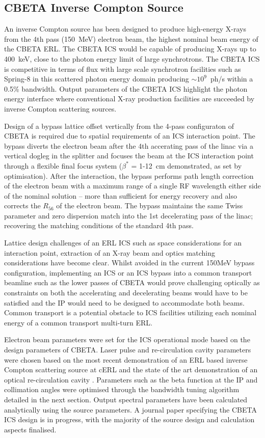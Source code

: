 \documentclass[10pt]{article}
\begin{document}
\subsection*{CBETA Inverse Compton Source}

An inverse Compton source has been designed to produce high-energy X-rays from the 4th pass (150~MeV) electron beam, the highest nominal beam energy of the CBETA ERL. The CBETA ICS would be capable of producing X-rays up to 400~keV, close to the photon energy limit of large synchrotrons. The CBETA ICS is competitive in terms of flux with large scale synchrotron facilities such as Spring-8 in this scattered photon energy domain producing $\sim 10^{9}$~ph/s within a 0.5\% bandwidth. Output parameters of the CBETA ICS highlight the photon energy interface where conventional X-ray production facilities are succeeded by inverse Compton scattering sources.

Design of a bypass lattice offset vertically from the 4-pass configuraton of CBETA is required due to spatial requirements of an ICS interaction point. The bypass diverts the electron beam after the 4th accerating pass of the linac via a vertical dogleg in the splitter and focuses the beam at the ICS interaction point through a flexible final focus system ($\beta^{*}$ = 1-12~cm demonstrated, as set by optimisation). After the interaction, the bypass performs path length correction of the electron beam with a maximum range of a single RF wavelength either side of the nominal solution -- more than sufficient for energy recovery and also corrects the $R_{56}$ of the electron beam. The bypass maintains the same Twiss parameter and zero dispersion match into the 1st decelerating pass of the linac; recovering the matching conditions of the standard 4th pass.

Lattice design challenges of an ERL ICS such as space considerations for an interaction point, extraction of an X-ray beam and optics matching considerations have become clear. Whilst avoided in the current 150MeV bypass configuration, implementing an ICS or an ICS bypass into a common transport beamline such as the lower passes of CBETA would prove challenging optically as constraints on both the accelerating and decelerating beams would have to be satisfied and the IP would need to be designed to accommodate both beams. Common transport is a potential obstacle to ICS facilities utilizing each nominal energy of a common transport multi-turn ERL.  

Electron beam parameters were set for the ICS operational mode based on the design parameters of CBETA. Laser pulse and re-circulation cavity parameters were chosen based on the most recent demonstration of an ERL based inverse Compton scattering source at cERL \cite{akagi2016narrow} and the state of the art demonstration of an optical re-circulation cavity \cite{carstens2014megawatt}. Parameters such as the beta function at the IP and collimation angles were optimised through the bandwidth tuning algorithm detailed in the next section. Output spectral parameters have been calculated analytically using the source parameters. A journal paper specifying the CBETA ICS design is in progress, with the majority of the source design and calculation aspects finalised.
  
\end{document}
